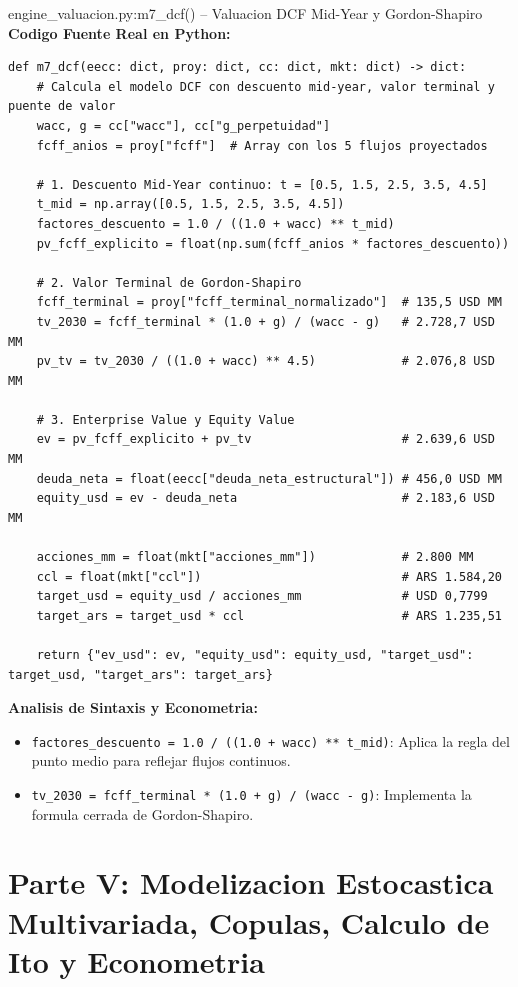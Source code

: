 \documentclass[10pt,a4paper]{article}
\theoremstyle{definition}
\begin{document}
\begin{codebox}{{engine\_valuacion.py:m7\_dcf() -- Valuacion DCF Mid-Year y Gordon-Shapiro}}
\textbf{Codigo Fuente Real en Python:}
\begin{verbatim}
def m7_dcf(eecc: dict, proy: dict, cc: dict, mkt: dict) -> dict:
    # Calcula el modelo DCF con descuento mid-year, valor terminal y puente de valor
    wacc, g = cc["wacc"], cc["g_perpetuidad"]
    fcff_anios = proy["fcff"]  # Array con los 5 flujos proyectados
    
    # 1. Descuento Mid-Year continuo: t = [0.5, 1.5, 2.5, 3.5, 4.5]
    t_mid = np.array([0.5, 1.5, 2.5, 3.5, 4.5])
    factores_descuento = 1.0 / ((1.0 + wacc) ** t_mid)
    pv_fcff_explicito = float(np.sum(fcff_anios * factores_descuento))
    
    # 2. Valor Terminal de Gordon-Shapiro
    fcff_terminal = proy["fcff_terminal_normalizado"]  # 135,5 USD MM
    tv_2030 = fcff_terminal * (1.0 + g) / (wacc - g)   # 2.728,7 USD MM
    pv_tv = tv_2030 / ((1.0 + wacc) ** 4.5)            # 2.076,8 USD MM
    
    # 3. Enterprise Value y Equity Value
    ev = pv_fcff_explicito + pv_tv                     # 2.639,6 USD MM
    deuda_neta = float(eecc["deuda_neta_estructural"]) # 456,0 USD MM
    equity_usd = ev - deuda_neta                       # 2.183,6 USD MM
    
    acciones_mm = float(mkt["acciones_mm"])            # 2.800 MM
    ccl = float(mkt["ccl"])                            # ARS 1.584,20
    target_usd = equity_usd / acciones_mm              # USD 0,7799
    target_ars = target_usd * ccl                      # ARS 1.235,51
    
    return {"ev_usd": ev, "equity_usd": equity_usd, "target_usd": target_usd, "target_ars": target_ars}
\end{verbatim}
\textbf{Analisis de Sintaxis y Econometria:}
\begin{itemize}
    \item \texttt{factores\_descuento = 1.0 / ((1.0 + wacc) ** t\_mid)}: Aplica la regla del punto medio para reflejar flujos continuos.
    \item \texttt{tv\_2030 = fcff\_terminal * (1.0 + g) / (wacc - g)}: Implementa la formula cerrada de Gordon-Shapiro.
\end{itemize}
\end{codebox}
\clearpage


\section{Parte V: Modelizacion Estocastica Multivariada, Copulas, Calculo de Ito y Econometria}
\end{document}
